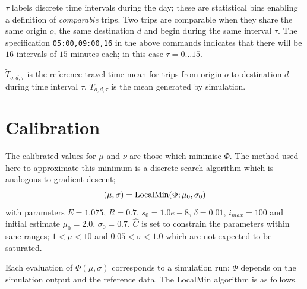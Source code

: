 $\tau$ labels discrete time intervals during the day; these are statistical bins enabling a definition of \emph{comparable} trips.
Two trips are comparable when they share the same origin $o$, the same destination $d$ and begin
during the same interval $\tau$. The specification {\tt 05:00,09:00,16} in the above commands indicates
that there will be $16$ intervals of $15$ minutes each; in this case $\tau=0\dots15$.

$\tilde{T}_{o,d,\tau}$ is the reference travel-time mean for trips from origin $o$ to
destination $d$ during time interval $\tau$. $T_{o,d,\tau}$ is the mean generated by simulation.

\section{Calibration}
The calibrated values for $\mu$ and $\nu$ are those which minimise $\Phi$.
The method used here to approximate this minimum is a discrete search algorithm which is
analogous to gradient descent;
\[
(\mu,\sigma) = {\textup{LocalMin}(\Phi;\mu_0,\sigma_0)}
\]
with parameters $E=1.075$, $R=0.7$, $s_0=1.0e-8$, $\delta=0.01$, $i_{max}=100$ and initial
estimate $\mu_0=2.0$, $\sigma_0=0.7$.
$\hat{C}$ is set to constrain the parameters within sane
ranges; $1 < \mu < 10$ and $0.05 < \sigma < 1.0$ which are not expected to be saturated.

Each evaluation of $\Phi(\mu,\sigma)$ corresponds to a simulation run;
$\Phi$ depends on the simulation output and the reference data.  The
LocalMin algorithm is as follows.

